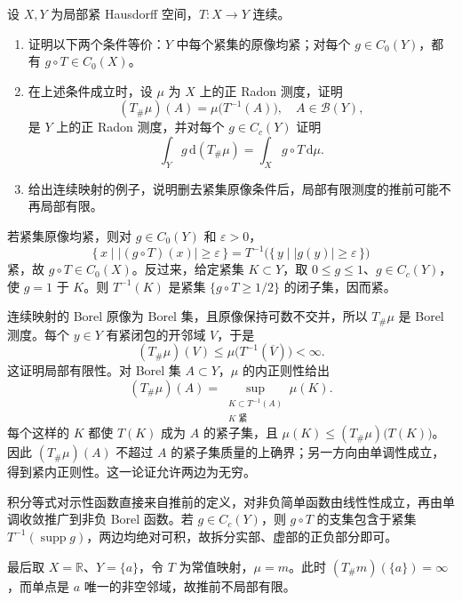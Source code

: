 \begin{exercise}\label{b1:ex:11-proper-pushforward}
设 \(X,Y\) 为局部紧 Hausdorff 空间，\(T:X\rightarrow Y\) 连续。
\begin{enumerate}
\item\label{b1:item:11-proper-pullback}
证明以下两个条件等价：\(Y\) 中每个紧集的原像均紧；对每个 \(g\in C_0(Y)\)，都有 \(g\circ T\in C_0(X)\)。
\item\label{b1:item:11-proper-radon}
在上述条件成立时，设 \(\mu\) 为 \(X\) 上的正 Radon 测度，证明
\[
 (T_\#\mu)(A)=\mu\bigl(T^{-1}(A)\bigr),\quad A\in\mathcal B(Y),
\]
是 \(Y\) 上的正 Radon 测度，并对每个 \(g\in C_c(Y)\) 证明
\[
 \int_Yg\,\mathrm d(T_\#\mu)=\int_Xg\circ T\,\mathrm d\mu.
\]
\item\label{b1:item:11-proper-failure}
给出连续映射的例子，说明删去紧集原像条件后，局部有限测度的推前可能不再局部有限。
\end{enumerate}
\end{exercise}
\begin{solution}
若紧集原像均紧，则对 \(g\in C_0(Y)\) 和 \(\varepsilon>0\)，
\[
 \{\,x\mid |(g\circ T)(x)|\ge\varepsilon\,\}
 =T^{-1}\bigl(\{\,y\mid |g(y)|\ge\varepsilon\,\}\bigr)
\]
紧，故 \(g\circ T\in C_0(X)\)。反过来，给定紧集 \(K\subset Y\)，取 \(0\le g\le1\)、\(g\in C_c(Y)\)，使 \(g=1\) 于 \(K\)。则 \(T^{-1}(K)\) 是紧集 \(\{g\circ T\ge1/2\}\) 的闭子集，因而紧。

连续映射的 Borel 原像为 Borel 集，且原像保持可数不交并，所以 \(T_\#\mu\) 是 Borel 测度。每个 \(y\in Y\) 有紧闭包的开邻域 \(V\)，于是
\[
 (T_\#\mu)(V)\le\mu\bigl(T^{-1}(\overline V)\bigr)<\infty.
\]
这证明局部有限性。对 Borel 集 \(A\subset Y\)，\(\mu\) 的内正则性给出
\[
 (T_\#\mu)(A)
 =\sup_{\substack{K\subset T^{-1}(A)\\K\text{ 紧}}}\mu(K).
\]
每个这样的 \(K\) 都使 \(T(K)\) 成为 \(A\) 的紧子集，且
\(\mu(K)\le(T_\#\mu)\bigl(T(K)\bigr)\)。因此 \((T_\#\mu)(A)\) 不超过 \(A\) 的紧子集质量的上确界；另一方向由单调性成立，得到紧内正则性。这一论证允许两边为无穷。

积分等式对示性函数直接来自推前的定义，对非负简单函数由线性性成立，再由单调收敛推广到非负 Borel 函数。若 \(g\in C_c(Y)\)，则 \(g\circ T\) 的支集包含于紧集 \(T^{-1}(\operatorname{supp}g)\)，两边均绝对可积，故拆分实部、虚部的正负部分即可。

最后取 \(X=\mathbb R\)、\(Y=\{a\}\)，令 \(T\) 为常值映射，\(\mu=m\)。此时 \((T_\#m)(\{a\})=\infty\)，而单点是 \(a\) 唯一的非空邻域，故推前不局部有限。
\end{solution}

